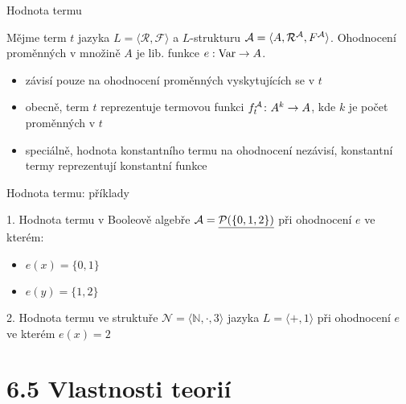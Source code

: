 \documentclass{beamer}
\begin{document}
\begin{frame}{Hodnota termu}

    Mějme term $t$ jazyka $L=\langle \mathcal R,\mathcal F\rangle$ a $L$-strukturu $\mathcal{A}=\langle A,\mathcal R^{\mathcal{A}},F^{\mathcal{A}}\rangle$. \alert{Ohodnocení proměnných} v množině $A$ je lib. funkce $e:\operatorname{Var}\to A$.
    

    \begin{itemize}
        \item závisí pouze na ohodnocení proměnných vyskytujících se v $t$
        \item obecně, term $t$ reprezentuje \alert{termovou funkci} $f_t^{\mathcal{A}}\colon A^k\to A$, kde $k$ je počet proměnných v $t$
        \item speciálně, hodnota konstantního termu na ohodnocení nezávisí, konstantní termy reprezentují konstantní funkce
    \end{itemize}
    
\end{frame}


\begin{frame}{Hodnota termu: příklady}
    
    1. Hodnota termu  v Booleově algebře $\mathcal{A}=\underline{\mathcal P(\{0,1,2\})}$ při ohodnocení $e$ ve kterém:
        \begin{itemize}
            \item $e(x)=\{0,1\}$
            \item $e(y)=\{1,2\}$
        \end{itemize}
  
    
    \bigskip\bigskip

    2. Hodnota termu  ve struktuře $\mathcal N=\langle\mathbb N,\cdot,3\rangle$ jazyka $L=\langle +,1\rangle$ při ohodnocení $e$ ve kterém $e(x)=2$ 

    
\end{frame}



\section{6.5 Vlastnosti teorií}
\end{document}
